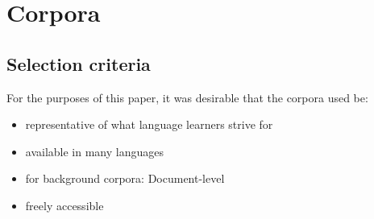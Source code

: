 \section{Corpora}
\subsection{Selection criteria}

For the purposes of this paper, it was desirable that the corpora used be:
\begin{itemize}
    \item representative of what language learners strive for
    \item available in many languages
    \item for background corpora: Document-level
    \item freely accessible
\end{itemize}

